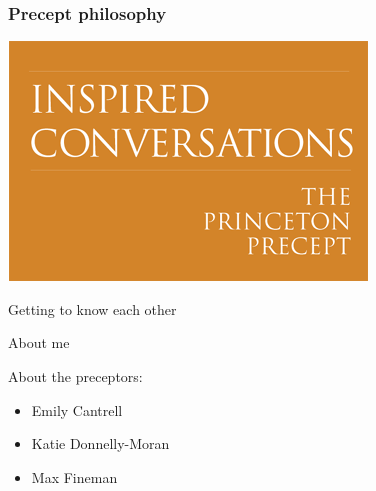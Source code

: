 \documentclass[aspectratio=169]{beamer}
\begin{document}
\begin{frame}
\frametitle{Precept philosophy}

\begin{center}
\includegraphics[height=0.80\textheight]{figures/princeton_precept}
\end{center}

\vfill
{}


\end{frame}
\begin{frame}

\begin{center}
\Large{Getting to know each other}
\end{center}

\end{frame}
\begin{frame}

\begin{center}
\Large{About me}
\end{center}

\end{frame}
\begin{frame}

About the preceptors:
\pause
\begin{itemize}
\item Emily Cantrell
\item Katie Donnelly-Moran
\item Max Fineman
\end{itemize}

\end{frame}
\end{document}
